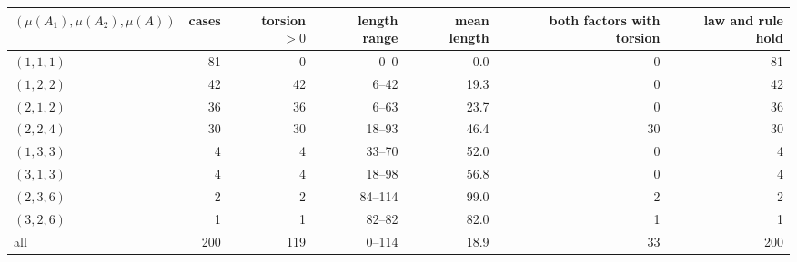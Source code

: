 \begin{tabular}{lrrrrrr}
\toprule
$(\mu(A_1),\mu(A_2),\mu(A))$ & cases & torsion $>0$ & length range & mean length & both factors with torsion & law and rule hold\\
\midrule
$(1,1,1)$ & 81 & 0 & 0--0 & 0.0 & 0 & 81 \\
$(1,2,2)$ & 42 & 42 & 6--42 & 19.3 & 0 & 42 \\
$(2,1,2)$ & 36 & 36 & 6--63 & 23.7 & 0 & 36 \\
$(2,2,4)$ & 30 & 30 & 18--93 & 46.4 & 30 & 30 \\
$(1,3,3)$ & 4 & 4 & 33--70 & 52.0 & 0 & 4 \\
$(3,1,3)$ & 4 & 4 & 18--98 & 56.8 & 0 & 4 \\
$(2,3,6)$ & 2 & 2 & 84--114 & 99.0 & 2 & 2 \\
$(3,2,6)$ & 1 & 1 & 82--82 & 82.0 & 1 & 1 \\
all & 200 & 119 & 0--114 & 18.9 & 33 & 200 \\
\bottomrule
\end{tabular}
